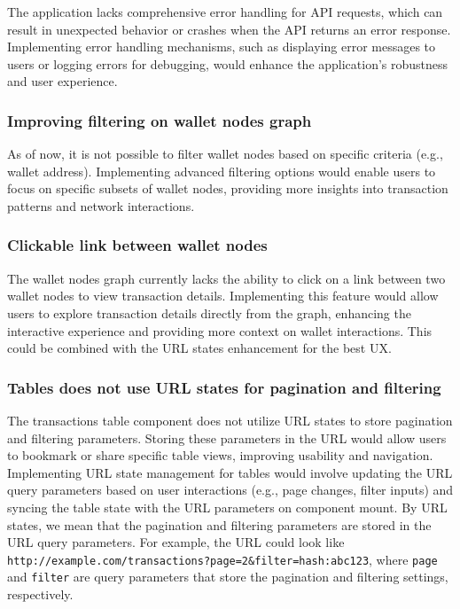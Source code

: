 The application lacks comprehensive error handling for API requests, which can result in unexpected behavior or crashes when the API returns an error response. Implementing error handling mechanisms, such as displaying error messages to users or logging errors for debugging, would enhance the application's robustness and user experience.

\subsubsection{Improving filtering on wallet nodes graph}

As of now, it is not possible to filter wallet nodes based on specific criteria (e.g., wallet address). Implementing advanced filtering options would enable users to focus on specific subsets of wallet nodes, providing more insights into transaction patterns and network interactions.

\subsubsection{Clickable link between wallet nodes}

The wallet nodes graph currently lacks the ability to click on a link between two wallet nodes to view transaction details. Implementing this feature would allow users to explore transaction details directly from the graph, enhancing the interactive experience and providing more context on wallet interactions.
This could be combined with the URL states enhancement for the best UX.

\subsubsection{Tables does not use URL states for pagination and filtering}

The transactions table component does not utilize URL states to store pagination and filtering parameters. Storing these parameters in the URL would allow users to bookmark or share specific table views, improving usability and navigation. Implementing URL state management for tables would involve updating the URL query parameters based on user interactions (e.g., page changes, filter inputs) and syncing the table state with the URL parameters on component mount.
By URL states, we mean that the pagination and filtering parameters are stored in the URL query parameters. For example, the URL could look like \texttt{http://example.com/transactions?page=2\&filter=hash:abc123}, where \texttt{page} and \texttt{filter} are query parameters that store the pagination and filtering settings, respectively.